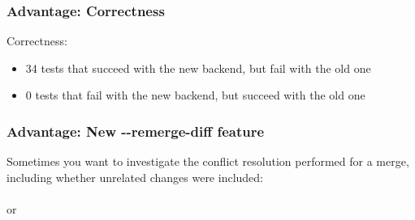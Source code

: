 \documentclass[compress,t]{beamer}
\begin{document}
\begin{frame}
  \frametitle{Advantage: Correctness}

  Correctness:
  \begin{itemize}
    \item 34 tests that succeed with the new backend, but fail with the old one
    \item \hspace*{0.5em}0 tests that fail with the new backend, but succeed with the old one
  \end{itemize}

\end{frame}


\begin{frame}
  \frametitle{Advantage: New {-}{-}remerge-diff feature}

  Sometimes you want to investigate the conflict resolution performed
  for a merge, including whether unrelated changes were included:\\
  \vspace*{\baselineskip}
  \qquad{}\\
  or\\
  \qquad{}

\end{frame}

\end{document}
